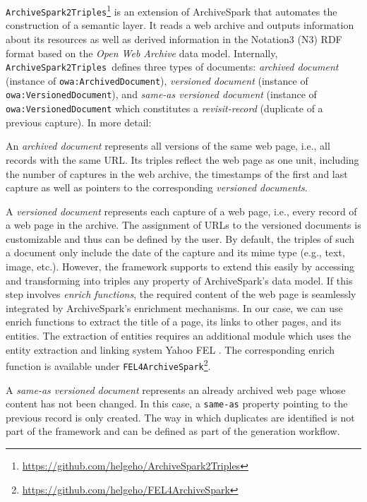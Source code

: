 \documentclass{libtex/sig-alternate-05-2015}
\newcommand{\tool}[0]{{\tt ArchiveSpark2Triples}}
\begin{document}
\tool\footnote{\url{https://github.com/helgeho/ArchiveSpark2Triples}}
is an extension of ArchiveSpark that automates the
construction of a semantic layer.
It reads a web archive and outputs information about
its resources as well as derived information in the Notation3 (N3) RDF format
based on the {\em Open Web Archive} data model.
Internally, \tool\ defines three types of documents:
\textit{archived document} (instance of {\tt owa:Archi\-ved\-Do\-cu\-ment}),
\textit{versioned document} (instance of {\tt owa:Ve\-rsi\-oned\-Do\-cu\-ment}), and
\textit{same-as versioned document} (instance of {\tt owa:Ve\-rsi\-oned\-Do\-cu\-ment}
which constitutes a \textit{revisit-record} (duplicate of a previous capture).
In more detail:
\begin{compactitem}
\item
An \textit{archived document} represents all versions of the same web page,
i.e., all records with the same URL.
Its triples reflect the web page as one unit, %
including the number of captures in the web archive,
the timestamps of the first and last capture as well as pointers to
the corresponding \textit{versioned documents}.

\item A \textit{versioned document} represents each capture of a web page,
i.e., every record of a web page in the archive.
The assignment of URLs to the versioned documents is customizable and thus can be defined by the user.
By default, the triples of such a document only include the date of the capture
and its mime type (e.g., text, image, etc.).
However, the framework supports to extend this easily
by accessing and transforming into triples any property of ArchiveSpark's data model.
If this step involves \textit{enrich functions},
the required content of the
web page is seamlessly integrated by ArchiveSpark's en\-ri\-ch\-ment me\-cha\-nisms.
In our case, we can use enrich functions to extract the title of a page, its
links to other pages, and its entities.
The extraction of entities requires an additional module
which uses the entity extraction and linking system Yahoo FEL \cite{BlancoWSDM2015}. %
The corresponding enrich function is available
under \texttt{FEL4\-Archi\-ve\-Spark}\footnote{\url{https://github.com/helgeho/FEL4ArchiveSpark}}.

\item A \textit{same-as versioned document} represents
an already archived web page whose content has not been changed.
In this case, a {\tt same-as} property pointing to the previous record
is only created. The way in which duplicates are identified
is not part of the framework and can be defined as part of the generation workflow.
\end{compactitem}
\vspace{0.8mm}
\end{document}
